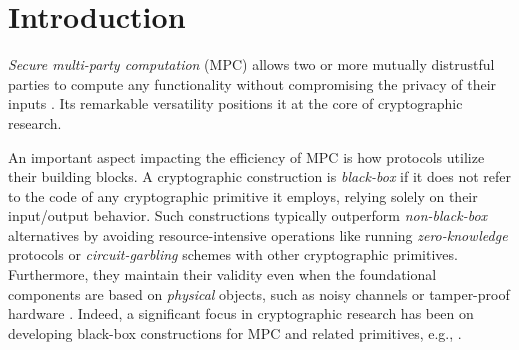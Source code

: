 
\section{Introduction}

{\em Secure multi-party computation} (MPC) allows two or more mutually distrustful parties to compute any functionality without compromising the privacy of their inputs \cite{FOCS:Yao86,STOC:GolMicWig87}. Its remarkable versatility positions it at the core of cryptographic research.

 An important aspect impacting the efficiency of MPC is how protocols utilize their building blocks. A cryptographic construction is {\em black-box} if it does not refer to the code of any cryptographic primitive it employs, relying solely on their input/output behavior. Such constructions typically outperform {\em non-black-box} alternatives by avoiding resource-intensive operations like running {\em zero-knowledge} protocols or {\em circuit-garbling} schemes with other cryptographic primitives. Furthermore, they maintain their validity even when the foundational components are based on {\em physical} objects, such as noisy channels or tamper-proof hardware \cite{wyner1975wire,FOCS:CreKil88,TCC:GLMMR04}. Indeed, a significant focus in cryptographic research has been on developing black-box constructions for MPC and related primitives, e.g., \cite{STOC:Kilian88,C:DamIsh05,STOC:IKLP06,STOC:IKOS07,TCC:Haitner08,C:IshPraSah08,TCC:PasWee09,FOCS:Wee10,STOC:Goyal11,FOCS:GLOV12,C:LinPas12,C:Kiyoshima14,STOC:GOSV14,TCC:GGMP16,C:HazVen16,EC:GarKiyPan18,TCC:KhuOstSri18,ICALP:ChaLiaPan20,SCN:GLPV20,EC:GKLW21,C:LiaPan21,C:ChiChuYam21,C:CCLY22}.  


